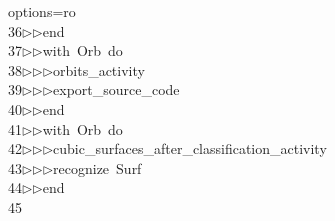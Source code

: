 \begin{tabbing}
\>options=ro\ \\[0pt]
36\>$\triangleright$\>$\triangleright$\>end\ \\[0pt]
37\>$\triangleright$\>$\triangleright$\>with\ Orb\ do\ \\[0pt]
38\>$\triangleright$\>$\triangleright$\>$\triangleright$\>orbits\_activity\ \\[0pt]
39\>$\triangleright$\>$\triangleright$\>$\triangleright$\>export\_source\_code\ \\[0pt]
40\>$\triangleright$\>$\triangleright$\>end\ \\[0pt]
41\>$\triangleright$\>$\triangleright$\>with\ Orb\ do\ \\[0pt]
42\>$\triangleright$\>$\triangleright$\>$\triangleright$\>cubic\_surfaces\_after\_classification\_activity\ \\[0pt]
43\>$\triangleright$\>$\triangleright$\>$\triangleright$\>recognize\ Surf\ \\[0pt]
44\>$\triangleright$\>$\triangleright$\>end\\[0pt]
45\>\end{tabbing}

